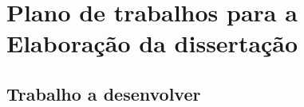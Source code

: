 \chapter{Plano de trabalhos para a Elaboração da dissertação}
\label{cha3}

%
\section{Trabalho a desenvolver}
